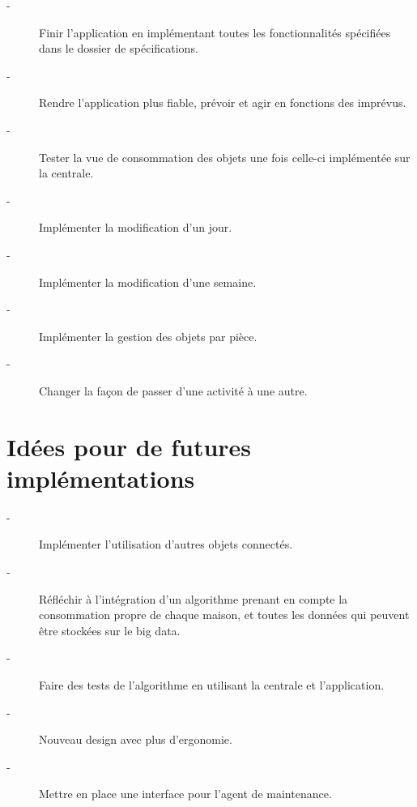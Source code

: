 \documentclass[11pt,a4paper]{report} %
\begin{document}
\begin{description}
	\item[-] Finir l'application en implémentant toutes les fonctionnalités spécifiées dans le dossier de spécifications. 
	\item[-] Rendre l'application plus fiable, prévoir et agir en fonctions des imprévus.
	\item[-] Tester la vue de consommation des objets une fois celle-ci implémentée sur la centrale.
	\item[-] Implémenter la modification d'un jour.
	\item[-] Implémenter la modification d'une semaine.
	\item[-] Implémenter la gestion des objets par pièce.
	\item[-] Changer la façon de passer d'une activité à une autre.
\end{description}
			
			
\newpage	
		\section{Idées pour de futures implémentations}

\begin{description}
	\item[-] Implémenter l'utilisation d'autres objets connectés.
	\item[-] Réfléchir à l'intégration d'un algorithme prenant en compte la consommation propre de chaque maison, et toutes les données qui peuvent être stockées sur le big data.
	\item[-] Faire des tests de l'algorithme en utilisant la centrale et l'application.
	\item[-] Nouveau design avec plus d'ergonomie.
	\item[-] Mettre en place une interface pour l'agent de maintenance.
\end{description}













		
\end{document}
